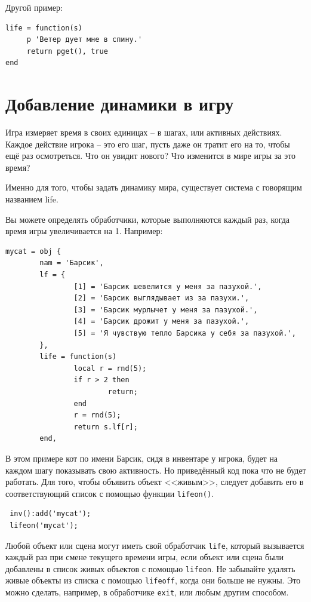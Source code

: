 \documentclass[a4paper,12pt]{article}
\begin{document}
Другой пример:

\begin{verbatim}
life = function(s)
     p 'Ветер дует мне в спину.'
     return pget(), true
end
\end{verbatim}

\section{Добавление динамики в игру}

Игра измеряет время в своих единицах -- в шагах, или активных действиях. Каждое действие игрока -- это его шаг, пусть даже он тратит его на то, чтобы ещё раз осмотреться. Что он увидит нового? Что изменится в мире игры за это время?

Именно для того, чтобы задать динамику мира, существует система с говорящим названием life.

Вы можете определять обработчики, которые выполняются каждый раз, когда время игры увеличивается на 1. Например:

\begin{verbatim}
mycat = obj {
        nam = 'Барсик',
        lf = {
                [1] = 'Барсик шевелится у меня за пазухой.',
                [2] = 'Барсик выглядывает из за пазухи.',
                [3] = 'Барсик мурлычет у меня за пазухой.',
                [4] = 'Барсик дрожит у меня за пазухой.',
                [5] = 'Я чувствую тепло Барсика у себя за пазухой.',
        },
        life = function(s)
                local r = rnd(5);
                if r > 2 then
                        return;
                end
                r = rnd(5);
                return s.lf[r];
        end,
\end{verbatim}

В этом примере кот по имени Барсик, сидя в инвентаре у игрока, будет на каждом шагу показывать свою активность. Но приведённый код пока что не будет работать. Для того, чтобы объявить объект <<живым>>, следует добавить его в соответствующий список с помощью функции \verb/lifeon()/.

\begin{verbatim}
 inv():add('mycat');
 lifeon('mycat');
\end{verbatim}

Любой объект или сцена могут иметь свой обработчик \verb/life/, который вызывается каждый раз при смене текущего времени игры, если объект или сцена были добавлены в список живых объектов с помощью \verb/lifeon/. Не забывайте удалять живые объекты из списка с помощью \verb/lifeoff/, когда они больше не нужны. Это можно сделать, например, в обработчике \verb/exit/, или любым другим способом.
\end{document}
